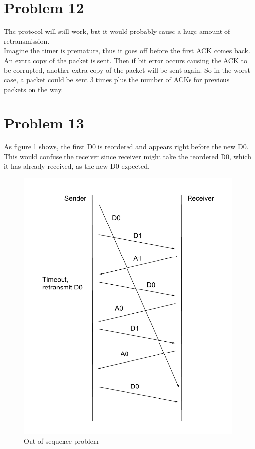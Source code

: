 \documentclass[titlepage, paper=a4, fontsize=11pt]{scrartcl} %
\numberwithin{equation}{section} %
\numberwithin{table}{section} %
\begin{document}
\section*{Problem 12}
The protocol will still work, but it would probably cause a huge amount of retransmission. \\
Imagine the timer is premature, thus it goes off before the first ACK comes back. An extra copy of
the packet is sent. Then if bit error occurs causing the ACK to be corrupted, another extra copy of the packet will be sent again. So in the worst case, a packet could be sent 3 times plus the number of ACKs for previous packets on the way.
\\



\section*{Problem 13}
As figure \ref{fig:p13} shows, the first D0 is reordered and appears right before the new D0.
This would confuse the receiver since receiver might take the reordered D0, which it has already received,
as the new D0 expected.
\begin{figure}[!ht]
    \includegraphics[width=\textwidth]{images/P13.pdf}
    \caption{Out-of-sequence problem}
    \label{fig:p13}
\end{figure}
\\
\end{document}
